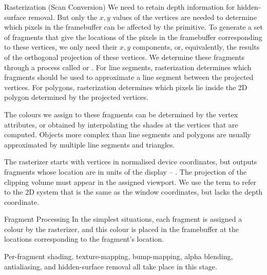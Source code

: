 \documentclass[../COS3712_Notes.tex]{subfiles}
\begin{document}
      \begin{definition}{Rasterization (Scan Conversion)}
        We need to retain depth information for hidden-surface removal.
        But only the $x, y$ values of the vertices are needed to determine which pixels
        in the framebuffer can be affected by the primitive.
        To generate a set of fragments that give the locations of the pixels in the framebuffer
        corresponding to these vertices, we only need their $x, y$ components,
        or, equivalently, the results of the orthogonal projection of these vertices.
        We determine these fragments through a process called 
        or .
        For line segments, rasterization determines which fragments should be used to approximate
        a line segment between the projected vertices.
        For polygons, rasterization determines which pixels lie inside the 2D polygon
        determined by the projected vertices.

        The colours we assign to these fragments can be determined by the vertex attributes,
        or obtained by interpolating the shades at the vertices that are computed.
        Objects more complex than line segments and polygons are usually approximated
        by multiple line segments and triangles.

        The rasterizer starts with vertices in normalised device coordinates,
        but outputs fragments whose location are in units of the display
        -- .
        The projection of the clipping volume must appear in the assigned viewport.
        We use the term  to refer to the 2D system that is the same
        as the window coordinates, but lacks the depth coordinate.
      \end{definition}

      \begin{definition}{Fragment Processing}
        In the simplest situations, each fragment is assigned a colour by the rasterizer,
        and this colour is placed in the framebuffer at the locations corresponding to the
        fragment's location.

        Per-fragment shading, texture-mapping, bump-mapping, alpha blending,
        antialiasing, and hidden-surface removal all take place in this stage.
      \end{definition}
\end{document}
